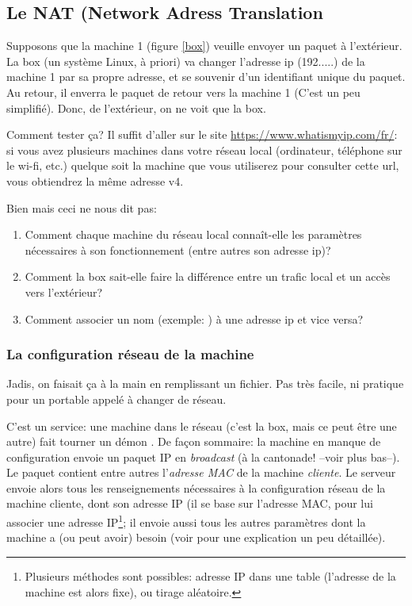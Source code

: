 \subsection{Le NAT (Network Adress Translation}
Supposons que la machine 1 (figure \ref{box}) veuille envoyer un
paquet à l'extérieur. La box (un système Linux, à priori) va changer
l'adresse ip (192.....) de la machine 1 par sa propre adresse, et se
souvenir d'un identifiant unique du paquet. Au retour, il enverra le
paquet de retour vers la machine 1 (C'est un peu simplifié). Donc, de
l'extérieur, on ne voit que la \og box\fg.

Comment tester ça? Il suffit d'aller sur le site
\url{https://www.whatismyip.com/fr/}: si vous avez plusieurs machines
dans votre réseau local (ordinateur, téléphone sur le wi-fi, etc.)
quelque soit la machine que vous utiliserez pour consulter cette url,
vous obtiendrez la même adresse v4.

Bien mais ceci ne nous dit pas:
\begin{enumerate}
\item Comment chaque machine du réseau local connaît-elle les
    paramètres nécessaires à son fonctionnement (entre autres son adresse ip)?
  \item Comment la box sait-elle faire la différence entre un trafic
    local et un accès vers l'extérieur?
  \item Comment associer un nom (exemple: ) à une
    adresse ip et vice versa?
\end{enumerate}


\subsubsection{La configuration réseau de la machine}
Jadis, on faisait ça à la main en remplissant un fichier. Pas très
facile, ni pratique pour un portable appelé à changer de réseau.

C'est un service: une machine dans le réseau (c'est la
box, mais ce peut être une autre) fait tourner un démon .
De façon sommaire: la machine en manque de configuration envoie un
paquet IP en \emph{broadcast} (à la cantonade! --voir plus bas--). Le
paquet contient 
entre autres l'\emph{adresse MAC} de la machine \emph{cliente}. Le
serveur  envoie alors tous les renseignements nécessaires à
la configuration réseau de la machine cliente, dont son adresse IP (il 
se base sur l'adresse MAC, pour lui associer une adresse
IP\footnote{Plusieurs méthodes sont possibles: adresse IP dans une
  table (l'adresse de la machine est alors fixe), ou tirage
  aléatoire.}; il envoie aussi tous les autres paramètres dont la
machine a (ou peut avoir) besoin
(voir \cite{dhcp} pour une explication un peu détaillée).
